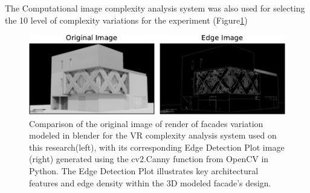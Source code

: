 The Computational image complexity analysis system was also used for selecting the 10 level of complexity variations for the experiment (Figure\ref{fig:CannyEdgePlotRender})

     \begin{figure}[htb]
          \centering
          \includegraphics[width= \linewidth]{Images/CannyEdgePlotRender}
          \caption{Comparison of the original image of render of facades variation modeled in blender for the VR complexity analysis system used on this research(left), with its corresponding Edge Detection Plot image (right) generated using the cv2.Canny function from OpenCV in Python. The Edge Detection Plot illustrates key architectural features and edge density within the 3D modeled facade's design.}
          \label{fig:CannyEdgePlotRender}
        \end{figure}

